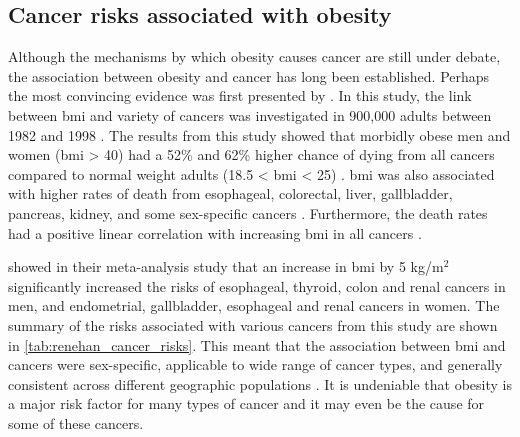 \subsection{Cancer risks associated with obesity}
\label{sub:cancer_risks_associated_with_obesity}

Although the mechanisms by which obesity causes cancer are still under debate, the association between obesity and cancer has long been established.
Perhaps the most convincing evidence was first presented by \citet{Calle2003}.
In this study, the link between \gls{bmi} and variety of cancers was investigated in 900,000 adults between 1982 and 1998 \citep{Calle2003}.
The results from this study showed that morbidly obese men and women (\gls{bmi} \textgreater{} 40) had a 52\% and 62\% higher chance of dying from all cancers compared to normal weight adults (18.5 \textless{} \gls{bmi} \textless{} 25) \citep{Calle2003}.
\gls{bmi} was also associated with higher rates of death from esophageal, colorectal, liver, gallbladder, pancreas, kidney, and some sex-specific cancers \citep{Calle2003}.
Furthermore, the death rates had a positive linear correlation with increasing \gls{bmi} in all cancers \citep{Calle2003}.

\citet{Renehan2008} showed in their meta-analysis study  that an increase in \gls{bmi} by 5 kg/m$^2$ significantly increased the risks of esophageal, thyroid, colon and renal cancers in men, and endometrial, gallbladder, esophageal and renal cancers in women.
The summary of the risks associated with various cancers from this study are shown in \cref{tab:renehan_cancer_risks}.
This meant that the association between \gls{bmi} and cancers were sex-specific, applicable to wide range of cancer types, and generally consistent across different geographic populations \citep{Renehan2008,Roberts2010}.
It is undeniable that obesity is a major risk factor for many types of cancer and it may even be the cause for some of these cancers.

